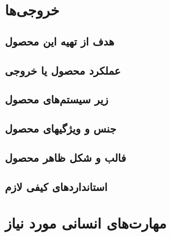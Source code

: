 %
% 
% 
% 
%
%
\section{خروجی‌ها}


\subsection{هدف از تهیه این محصول}


\subsection{عملکرد محصول یا خروجی}


\subsection{زیر سیستم‌های محصول}


\subsection{جنس و ویژگیهای محصول}


\subsection{فالب و شکل ظاهر محصول}


\subsection{استانداردهای کیفی لازم}


\section{مهارت‌های انسانی مورد نیاز}



